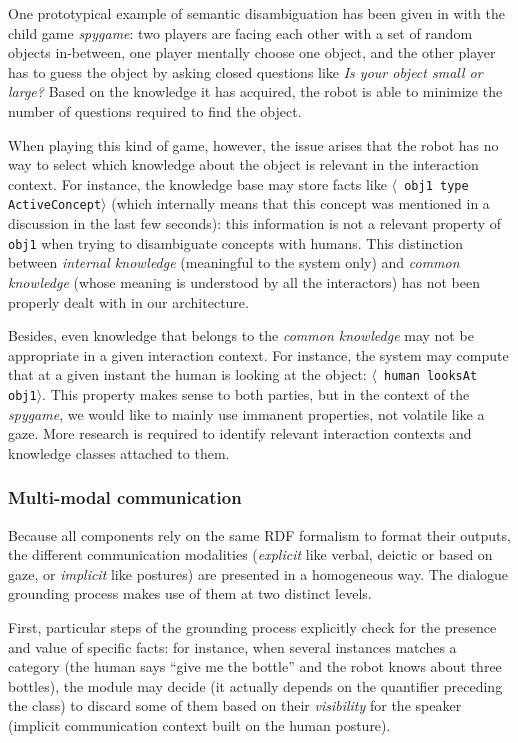 \documentclass[preprint,5p]{elsarticle}
\newcommand{\concept}[1]{{\small \texttt{#1}}}
\newcommand{\stmt}[1]{{\footnotesize \tt $\langle$ #1\relax$\rangle$}}
\begin{document}
One prototypical example of semantic disambiguation has been given in
\cite{Ros2010b} with the child game \emph{spygame}: two players are facing
each other with a set of random objects in-between, one player mentally choose
one object, and the other player has to guess the object by asking closed
questions like \emph{Is your object small or large?} Based on the knowledge it
has acquired, the robot is able to minimize the number of questions required to
find the object.

When playing this kind of game, however, the issue arises that the robot has no
way to select which knowledge about the object is relevant in the interaction
context. For instance, the knowledge base may store facts like \stmt{obj1 type
ActiveConcept} (which internally means that this concept was mentioned in a
discussion in the last few seconds): this information is not a relevant
property of \concept{obj1} when trying to disambiguate concepts with humans.
This distinction between \emph{internal knowledge} (meaningful to
the system only) and \emph{common knowledge} (whose meaning is understood by
all the interactors) has not been properly dealt with in our architecture.

Besides, even knowledge that belongs to the \emph{common knowledge} may not be
appropriate in a given interaction context. For instance, the system may
compute that at a given instant the human is looking at the object: \stmt{human
looksAt obj1}. This property makes sense to both parties, but in the context of
the \emph{spygame}, we would like to mainly use immanent properties, not
volatile like a gaze. More research is required to identify relevant
interaction contexts and knowledge classes attached to them.

\subsubsection{Multi-modal communication}

Because all components rely on the same RDF formalism to format their outputs,
the different communication modalities (\emph{explicit} like verbal, deictic or
based on gaze, or \emph{implicit} like postures) are presented in a homogeneous
way. The dialogue grounding process makes use of them at two distinct levels.

First, particular steps of the grounding process explicitly check for the
presence and value of specific facts: for instance, when several instances
matches a category (the human says ``give me the bottle'' and the robot knows
about three bottles), the module may decide (it actually depends on the
quantifier preceding the class) to discard some of them based on their
\emph{visibility} for the speaker (implicit communication context built on the
human posture).
\end{document}
